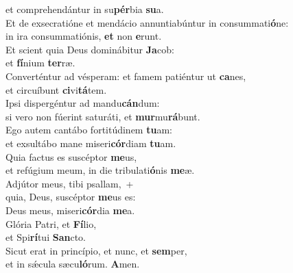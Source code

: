 \oddverse et comprehendántur in su\textbf{pér}bia \textbf{su}a.\\
\evenverse Et de exsecratióne et mendácio annuntiabúntur in consummati\textbf{ó}ne:~\*\\
\evenverse in ira consummatiónis, \textbf{et} non \textbf{e}runt.\\
\oddverse Et scient quia Deus dominábitur \textbf{Ja}cob:~\*\\
\oddverse et \textbf{fí}nium \textbf{ter}ræ.\\
\evenverse Converténtur ad vésperam: et famem patiéntur ut \textbf{ca}nes,~\*\\
\evenverse et circuíbunt \textbf{ci}vi\textbf{tá}tem.\\
\oddverse Ipsi dispergéntur ad mandu\textbf{cán}dum:~\*\\
\oddverse si vero non fúerint saturáti, et \textbf{mur}mu\textbf{rá}bunt.\\
\evenverse Ego autem cantábo fortitúdinem \textbf{tu}am:~\*\\
\evenverse et exsultábo mane miseri\textbf{cór}diam \textbf{tu}am.\\
\oddverse Quia factus es suscéptor \textbf{me}us,~\*\\
\oddverse et refúgium meum, in die tribulati\textbf{ó}nis \textbf{me}æ.\\
\evenverse Adjútor meus, tibi psallam,~+\\
\evenverse  quia, Deus, suscéptor \textbf{me}us es:~\*\\
\evenverse Deus meus, miseri\textbf{cór}dia \textbf{me}a.\\
\oddverse Glória Patri, et \textbf{Fí}lio,~\*\\
\oddverse et Spi\textbf{rí}tui \textbf{San}cto.\\
\evenverse Sicut erat in princípio, et nunc, et \textbf{sem}per,~\*\\
\evenverse et in sǽcula sæcu\textbf{ló}rum. \textbf{A}men.\\
